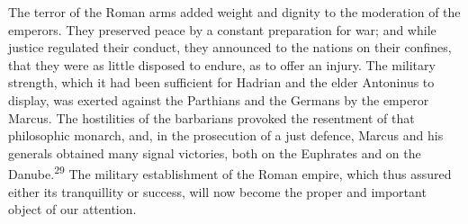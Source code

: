

The terror of the Roman arms added weight and dignity to the
moderation of the emperors. They preserved peace by a constant
preparation for war; and while justice regulated their conduct,
they announced to the nations on their confines, that they were
as little disposed to endure, as to offer an injury. The military
strength, which it had been sufficient for Hadrian and the elder
Antoninus to display, was exerted against the Parthians and the
Germans by the emperor Marcus. The hostilities of the barbarians
provoked the resentment of that philosophic monarch, and, in the
prosecution of a just defence, Marcus and his generals obtained
many signal victories, both on the Euphrates and on the Danube.\textsuperscript{29}
The military establishment of the Roman empire, which thus
assured either its tranquillity or success, will now become the
proper and important object of our attention.


